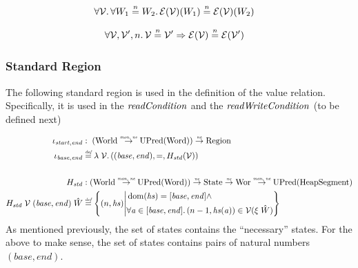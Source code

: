 \documentclass{article}
\newcommand{\monnefun}{\stackrel{\textit{\tiny{mon, ne}}}{\rightarrow}}
\newcommand{\nefun}{\stackrel{\textit{\tiny{ne}}}{\rightarrow}}
\newcommand{\defeq}{\stackrel{\textit{\tiny{def}}}{=}}
\newcommand{\nequal}[1][n]{\stackrel{\tiny{#1}}{=}}
\DeclareMathOperator{\dom}{dom}
\newcommand{\var}[1]{\mathit{#1}}
\newcommand{\hs}{\var{hs}}
\newcommand{\addr}{\var{a}}
\newcommand{\plainfun}[2]{
  \ifthenelse{\equal{#2}{}}
             {\mathit{#1}}
             {\mathit{#1}(#2)}
}
\newcommand{\readCond}[1]{\plainfun{readCondition}{#1}}
\newcommand{\writeCond}[1]{\plainfun{readWriteCondition}{#1}}
\newcommand{\asmType}{\plaindom{AsmType}}
\newcommand{\plaindom}[1]{\mathrm{#1}}
\newcommand{\Words}{\plaindom{Word}}
\newcommand{\HeapSegments}{\plaindom{HeapSegment}}
\newcommand{\States}{\plaindom{State}}
\newcommand{\Regions}{\plaindom{Region}}
\newcommand{\Worlds}{\plaindom{World}}
\newcommand{\Wor}{\plaindom{Wor}}
\newcommand{\UPred}[1]{\plaindom{UPred}(#1)}
\newcommand{\intr}[2]{\mathcal{#1}}
\newcommand{\valueintr}[1]{\intr{V}{#1}}
\newcommand{\exprintr}[1]{\intr{E}{#1}}
\newcommand{\stdvr}{\valueintr{\asmType}}
\newcommand{\stder}{\exprintr{\asmType}}
\newcommand{\npair}[2][n]{\left(#1,#2 \right)}
\begin{document}
\begin{lemma}
\label{lem:stder-ne-worlds}
\begin{align*}
  & \forall \stdvr \ldotp \forall W_1 \nequal W_2 \ldotp \stder(\stdvr)(W_1) \nequal \stder(\stdvr)(W_2)
\end{align*}
\end{lemma}

\begin{lemma}
\label{lem:stder-ne-vr}
\begin{align*}
  &\forall \stdvr, \stdvr', n \ldotp \stdvr \nequal \stdvr' \Rightarrow \stder(\stdvr) \nequal \stder(\stdvr')
\end{align*}
\end{lemma}


\subsubsection{Standard Region}
\label{subsubsec:standard-region}
The following standard region is used in the definition of the value relation. Specifically, it is used in the $\readCond{}$ and the $\writeCond{}$ (to be defined next)

\begin{align*}
  \iota_{\var{start},\var{end}} & : \; (\Worlds \monnefun \UPred{\Words}) \nefun \Regions\\
  \iota_{\var{base},\var{end}} & \defeq \lambda \; \stdvr \ldotp ((\var{base},\var{end}),=,H_{\var{std}} (\stdvr)) \\ & \\
  H_{\var{std}} & : (\Worlds \monnefun \UPred{\Words}) \nefun \States \nefun \Wor \monnefun \UPred{\HeapSegments} \\
  H_{\var{std}} \; \stdvr \; (\var{base},\var{end})\; \hat{W} &  \defeq \left\{ \npair{\hs} \middle|
                                               \begin{aligned}
                                                 & \dom(\hs) = [\var{base},\var{end}] \land \\
                                                 & \forall \addr \in [\var{base},\var{end}] \ldotp \npair[n-1]{\hs(\addr)} \in \stdvr(\xi \; \hat{W})
                                               \end{aligned} \right\}
\end{align*}
As mentioned previously, the set of states contains the ``necessary'' states. For the above to make sense, the set of states contains pairs of natural numbers $(\var{base},\var{end})$.
\end{document}
